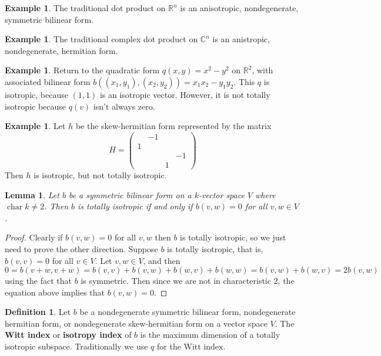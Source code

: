 \documentclass[12pt]{article}
\newtheorem{lemma}[theorem]{Lemma}
\theoremstyle{definition}
\newtheorem{definition}[theorem]{Definition}
\newtheorem{example}[theorem]{Example}
\numberwithin{theorem}{subsection}
\newcommand{\R}{\mathbb{R}}
\newcommand{\C}{\mathbb{C}}
\newcommand{\tbf}{\textbf}
\DeclareMathOperator{\characteristic}{char}
\begin{document}
\begin{example}
The traditional dot product on $\R^n$ is an anisotropic, nondegenerate, symmetric bilinear form.
\end{example}

\begin{example}
The traditional complex dot product on $\C^n$ is an anistropic, nondegenerate, hermitian form.
\end{example}

\begin{example}
Return to the quadratic form $q(x,y) = x^2 - y^2$ on $\R^2$, with associated bilinear form $b((x_1, y_1), (x_2, y_2)) = x_1 x_2 - y_1 y_2$. This $q$ is isotropic, because $(1,1)$ is an isotropic vector. However, it is not totally isotropic because $q(v)$ isn't always zero.
\end{example}

\begin{example}
Let $h$ be the skew-hermitian form represented by the matrix
\[
	H = 
	\begin{pmatrix}
		& -1 \\
		1 \\
		&&& -1 \\
		&& 1
	\end{pmatrix}
\]
Then $h$ is isotropic, but not totally isotropic.
\end{example}

\begin{lemma}
Let $b$ be a symmetric bilinear form on a $k$-vector space $V$ where $\characteristic k \neq 2$. Then $b$ is totally isotropic if and only if $b(v,w) = 0$ for all $v, w \in V$.
\end{lemma}
\begin{proof}
Clearly if $b(v,w) = 0$ for all $v,w$ then $b$ is totally isotropic, so we just need to prove the other direction. Suppose $b$ is totally isotropic, that is, $b(v,v) =0$ for all $v \in V$. Let $v,w \in V$, and then
\[
	0 = b(v+w, v+w) = b(v,v) + b(v,w) + b(w,v) + b(w,w) = b(v,w) + b(w,v) = 2b(v,w)
\]
using the fact that $b$ is symmetric. Then since we are not in characteristic 2, the equation above implies that $b(v,w) = 0$.
\end{proof}

\begin{definition}
Let $b$ be a nondegenerate symmetric bilinear form, nondegenerate hermitian form, or nondegenerate skew-hermitian form on a vector space $V$. The \tbf{Witt index} or \tbf{isotropy index} of $b$ is the maximum dimension of a totally isotropic subspace. Traditionally we use $q$ for the Witt index.
\end{definition}
\end{document}
